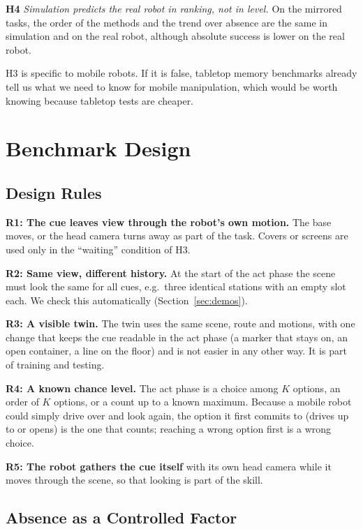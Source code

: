 \documentclass[conference]{IEEEtran}
\begin{document}
\textbf{H4} \emph{Simulation predicts the real robot in ranking, not in level.} On the mirrored tasks, the order of the methods and the trend over absence are the same in simulation and on the real robot, although absolute success is lower on the real robot.

H3 is specific to mobile robots. If it is false, tabletop memory benchmarks already tell us what we need to know for mobile manipulation, which would be worth knowing because tabletop tests are cheaper.

\section{Benchmark Design}

\subsection{Design Rules}
\label{sec:rules}

\textbf{R1: The cue leaves view through the robot's own motion.} The base moves, or the head camera turns away as part of the task. Covers or screens are used only in the ``waiting'' condition of H3.

\textbf{R2: Same view, different history.} At the start of the act phase the scene must look the same for all cues, e.g.\ three identical stations with an empty slot each. We check this automatically (Section~\ref{sec:demos}).

\textbf{R3: A visible twin.} The twin uses the same scene, route and motions, with one change that keeps the cue readable in the act phase (a marker that stays on, an open container, a line on the floor) and is not easier in any other way. It is part of training and testing.

\textbf{R4: A known chance level.} The act phase is a choice among $K$ options, an order of $K$ options, or a count up to a known maximum. Because a mobile robot could simply drive over and look again, the option it first commits to (drives up to or opens) is the one that counts; reaching a wrong option first is a wrong choice.

\textbf{R5: The robot gathers the cue itself} with its own head camera while it moves through the scene, so that looking is part of the skill.

\subsection{Absence as a Controlled Factor}
\end{document}
